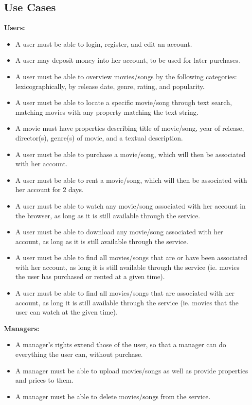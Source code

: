 \subsection{Use Cases}
\label{app:usecases}
\textbf{Users:}
\begin{itemize}
\item A user must be able to login, register, and edit an account.
\item A user may deposit money into her account, to be used for later purchases.
\item A user must be able to overview movies/songs by the following categories: lexicographically, by release date, genre, rating, and popularity.
\item A user must be able to locate a specific movie/song through text search, matching movies with any property matching the text string.
\item A movie must have properties describing title of movie/song, year of release, director(s), genre(s) of movie, and a textual description.
\item A user must be able to purchase a movie/song, which will then be associated with her account.
\item A user must be able to rent a movie/song, which will then be associated with her account for 2 days.
\item A user must be able to watch any movie/song associated with her account in the browser, as long as it is still available through the service.
\item A user must be able to download any movie/song associated with her account, as long as it is still available through the service.
\item A user must be able to find all movies/songs that are or have been associated with her account, as long it is still available through the service (ie. movies the user has purchased or rented at a given time).
\item A user must be able to find all movies/songs that are associated with her account, as long it is still available through the service (ie. movies that the user can watch at the given time).
\end{itemize}
\textbf{Managers:}
\begin{itemize}
\item A manager's rights extend those of the user, so that a manager can do everything the user can, without purchase.
\item A manager must be able to upload movies/songs as well as provide properties and prices to them.
\item A manager must be able to delete movies/songs from the service.
\end{itemize}